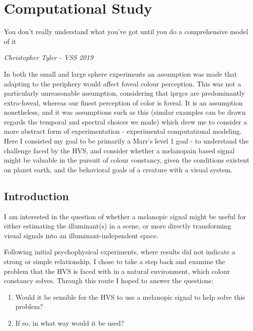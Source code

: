\chapter{Computational Study}
\label{ComputationalStudyChapter}


\begin{quote}

\end{quote}

\epigraph{You don't really understand what you've got until you do a comprehensive model of it}{\textit{Christopher Tyler - VSS 2019}}

In both the small and large sphere experiments an assumption was made that adapting to the periphery would affect foveal colour perception. This was not a particularly unreasonable assumption, considering that iprgcs are predominantly extra-foveal, whereas our finest perception of color is foveal.
It is an assumption nonetheless, and it was assumptions such as this (similar examples can be drawn regards the temporal and spectral choices we made) which drew me to consider a more abstract form of experimentation - experimental computational modeling.
Here I consisted my goal to be primarily a Marr's level 1 goal - to understand the challenge faced by the HVS, and consider whether a melanopain based signal might be valuable in the pursuit of colour constancy, given the conditions existent on planet earth, and the behavioral goals of a creature with a visual system.


\section{Introduction}

I am interested in the question of whether a melanopic signal might be useful for either estimating the illuminant(s) in a scene, or more directly transforming visual signals into an illuminant-independent space.

Following initial psychophysical experiments, where results did not indicate a strong or simple relationship, I chose to take a step back and examine the problem that the HVS is faced with in a natural environment, which colour constancy solves. Through this route I hoped to answer the questions:
\begin{enumerate}
	\item Would it be sensible for the HVS to use a melanopic signal to help solve this problem?
	\item If so, in what way would it be used?
\end{enumerate}

